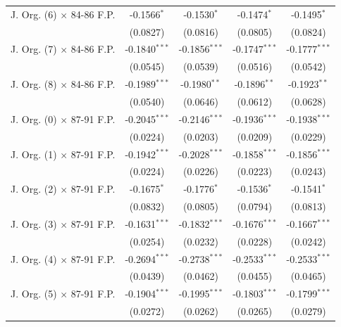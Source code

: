 \documentclass[
  12pt]{article}
\begin{document}
\begin{table}
\begin{minipage}[t]{\linewidth}
{\begin{tabular}{lcccc}
   J. Org. (6) $\times$ 84-86 F.P.  & -0.1566$^{*}$   & -0.1530$^{*}$   & -0.1474$^{*}$   & -0.1495$^{*}$\\   
                                    & (0.0827)        & (0.0816)        & (0.0805)        & (0.0824)\\   
   J. Org. (7) $\times$ 84-86 F.P.  & -0.1840$^{***}$ & -0.1856$^{***}$ & -0.1747$^{***}$ & -0.1777$^{***}$\\   
                                    & (0.0545)        & (0.0539)        & (0.0516)        & (0.0542)\\   
   J. Org. (8) $\times$ 84-86 F.P.  & -0.1989$^{***}$ & -0.1980$^{**}$  & -0.1896$^{**}$  & -0.1923$^{**}$\\   
                                    & (0.0540)        & (0.0646)        & (0.0612)        & (0.0628)\\   
   J. Org. (0) $\times$ 87-91 F.P.  & -0.2045$^{***}$ & -0.2146$^{***}$ & -0.1936$^{***}$ & -0.1938$^{***}$\\   
                                    & (0.0224)        & (0.0203)        & (0.0209)        & (0.0229)\\   
   J. Org. (1) $\times$ 87-91 F.P.  & -0.1942$^{***}$ & -0.2028$^{***}$ & -0.1858$^{***}$ & -0.1856$^{***}$\\   
                                    & (0.0224)        & (0.0226)        & (0.0223)        & (0.0243)\\   
   J. Org. (2) $\times$ 87-91 F.P.  & -0.1675$^{*}$   & -0.1776$^{*}$   & -0.1536$^{*}$   & -0.1541$^{*}$\\   
                                    & (0.0832)        & (0.0805)        & (0.0794)        & (0.0813)\\   
   J. Org. (3) $\times$ 87-91 F.P.  & -0.1631$^{***}$ & -0.1832$^{***}$ & -0.1676$^{***}$ & -0.1667$^{***}$\\   
                                    & (0.0254)        & (0.0232)        & (0.0228)        & (0.0242)\\   
   J. Org. (4) $\times$ 87-91 F.P.  & -0.2694$^{***}$ & -0.2738$^{***}$ & -0.2533$^{***}$ & -0.2533$^{***}$\\   
                                    & (0.0439)        & (0.0462)        & (0.0455)        & (0.0465)\\   
   J. Org. (5) $\times$ 87-91 F.P.  & -0.1904$^{***}$ & -0.1995$^{***}$ & -0.1803$^{***}$ & -0.1799$^{***}$\\   
                                    & (0.0272)        & (0.0262)        & (0.0265)        & (0.0279)\\   

\end{tabular}}
\end{minipage}
\end{table}
\end{document}
